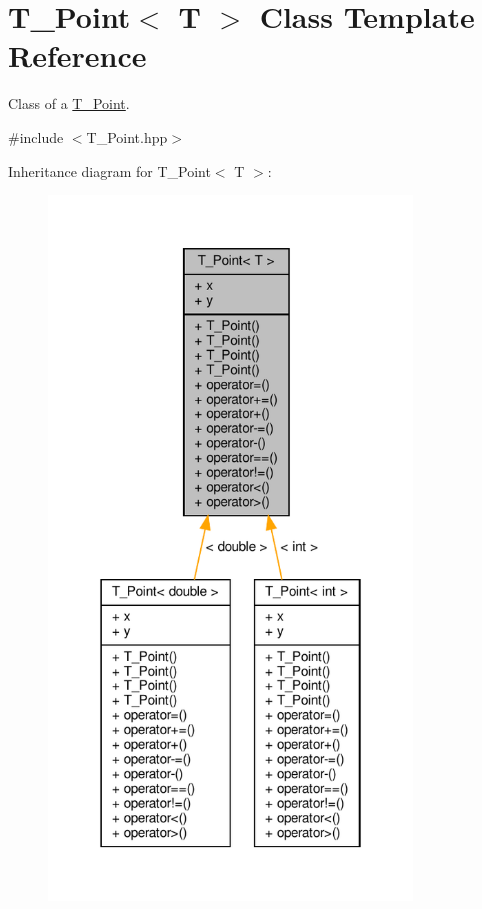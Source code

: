 \hypertarget{classT__Point}{}\section{T\+\_\+\+Point$<$ T $>$ Class Template Reference}
\label{classT__Point}


Class of a \hyperlink{classT__Point}{T\+\_\+\+Point}.  




{\ttfamily \#include $<$T\+\_\+\+Point.\+hpp$>$}



Inheritance diagram for T\+\_\+\+Point$<$ T $>$\+:\nopagebreak
\begin{figure}[H]
\begin{center}
\leavevmode
\includegraphics[width=274pt]{classT__Point__inherit__graph}
\end{center}
\end{figure}


